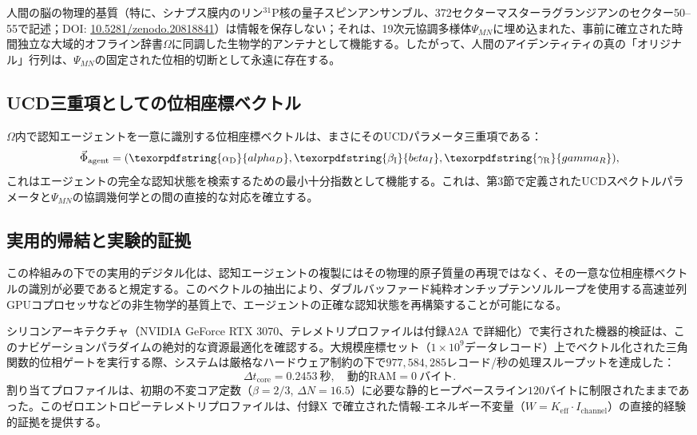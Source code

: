 \documentclass[11pt,a4paper]{article}
\DeclareRobustCommand{\alD}{\texorpdfstring{\ensuremath{\alpha_{\mathrm{D}}}}{alpha_D}}
\DeclareRobustCommand{\beI}{\texorpdfstring{\ensuremath{\beta_{\mathrm{I}}}}{beta_I}}
\DeclareRobustCommand{\gaR}{\texorpdfstring{\ensuremath{\gamma_{\mathrm{R}}}}{gamma_R}}
\begin{document}
	人間の脳の物理的基質（特に、シナプス膜内のリン\(^{31}\)P核の量子スピンアンサンブル、372セクターマスターラグランジアンのセクター50--55で記述；DOI: \href{https://doi.org/10.5281/zenodo.20818841}{10.5281/zenodo.20818841}）は情報を保存しない；それは、19次元協調多様体\(\Psi_{MN}\)に埋め込まれた、事前に確立された時間独立な大域的オフライン辞書\(\Omega\)に同調した生物学的アンテナとして機能する。したがって、人間のアイデンティティの真の「オリジナル」行列は、\(\Psi_{MN}\)の固定された位相的切断として永遠に存在する。
	
	\subsection{UCD三重項としての位相座標ベクトル}
	
	\(\Omega\)内で認知エージェントを一意に識別する位相座標ベクトルは、まさにそのUCDパラメータ三重項である：
	\[
	\vec{\Phi}_{\mathrm{agent}} = (\alD, \beI, \gaR),
	\]
	これはエージェントの完全な認知状態を検索するための最小十分指数として機能する。これは、第3節で定義されたUCDスペクトルパラメータと\(\Psi_{MN}\)の協調幾何学との間の直接的な対応を確立する。
	
	\subsection{実用的帰結と実験的証拠}
	
	この枠組みの下での実用的デジタル化は、認知エージェントの複製にはその物理的原子質量の再現ではなく、その一意な位相座標ベクトルの識別が必要であると規定する。このベクトルの抽出により、ダブルバッファード純粋オンチップテンソルループを使用する高速並列GPUコプロセッサなどの非生物学的基質上で、エージェントの正確な認知状態を再構築することが可能になる。
	
	シリコンアーキテクチャ（NVIDIA GeForce RTX 3070、テレメトリプロファイルは付録A2A \cite{yuct_a2a}で詳細化）で実行された機器的検証は、このナビゲーションパラダイムの絶対的な資源最適化を確認する。大規模座標セット（\(1\times10^9\)データレコード）上でベクトル化された三角関数的位相ゲートを実行する際、システムは厳格なハードウェア制約の下で\(977,584,285\)レコード/秒の処理スループットを達成した：
	\begin{equation}
		\Delta t_{\mathrm{core}} = 0.2453\ \text{秒}, \quad \text{動的RAM} = 0\ \text{バイト}.
	\end{equation}
	割り当てプロファイルは、初期の不変コア定数（\(\beta = 2/3\), \(\Delta N = 16.5\)）に必要な静的ヒープベースライン\(120\)バイトに制限されたままであった。このゼロエントロピーテレメトリプロファイルは、付録X \cite{yuct_appX}で確立された情報-エネルギー不変量（\(W = K_{\mathrm{eff}} \cdot I_{\mathrm{channel}}\)）の直接的経験的証拠を提供する。
	
\end{document}
